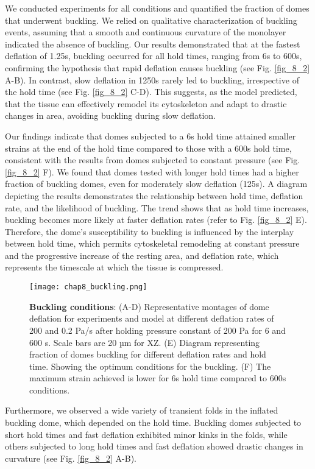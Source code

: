 We conducted experiments for all conditions and quantified the fraction of domes that underwent buckling. We relied on qualitative characterization of buckling events, assuming that a smooth and continuous curvature of the monolayer indicated the absence of buckling. Our results demonstrated that at the fastest deflation of 1.25s, buckling occurred for all hold times, ranging from 6s to 600s, confirming the hypothesis that rapid deflation causes buckling (see Fig. \ref{fig_8_2} A-B). In contrast, slow deflation in 1250s rarely led to buckling, irrespective of the hold time (see Fig. \ref{fig_8_2} C-D). This suggests, as the model predicted, that the tissue can effectively remodel its cytoskeleton and adapt to drastic changes in area, avoiding buckling during slow deflation.

Our findings indicate that domes subjected to a 6s hold time attained smaller strains at the end of the hold time compared to those with a 600s hold time, consistent with the results from domes subjected to constant pressure (see Fig. \ref{fig_8_2} F). We found that domes tested with longer hold times had a higher fraction of buckling domes, even for moderately slow deflation (125s). A  diagram depicting the results demonstrates the relationship between hold time, deflation rate, and the likelihood of buckling. The trend shows that as hold time increases, buckling becomes more likely at faster deflation rates (refer to Fig. \ref{fig_8_2} E). Therefore, the dome's susceptibility to buckling is influenced by the interplay between hold time, which permits cytoskeletal remodeling at constant pressure and the progressive increase of the resting area, and deflation rate, which represents the timescale at which the tissue is compressed.

\begin{figure}[b!]
	\centering
	\texttt{[image: chap8\_buckling.png]}
	\caption{\label{fig_8_3} \textbf{Buckling conditions}: (A-D) Representative montages of dome deflation for experiments and model at different deflation rates of 200 and 0.2 Pa/s after holding pressure constant of 200 Pa for 6 and 600 s. Scale bars are 20 µm for XZ. (E) Diagram representing fraction of domes buckling for different deflation rates and hold time. Showing the optimum conditions for the buckling. (F) The maximum strain achieved is lower for 6s hold time compared to 600s conditions.}
\end{figure}

Furthermore, we observed a wide variety of transient folds in the inflated buckling dome, which depended on the hold time. Buckling domes subjected to short hold times and fast deflation exhibited minor kinks in the folds, while others subjected to long hold times and fast deflation showed drastic changes in curvature (see Fig. \ref{fig_8_2} A-B).

